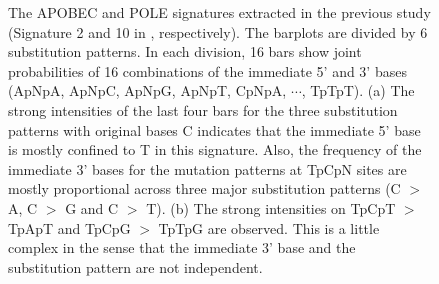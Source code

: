 \begin{figure}[b]
\centering
{}
  
  
\caption{The APOBEC and POLE signatures extracted in the previous study (Signature 2 and 10 in \cite{pmid23945592}, respectively).
The barplots are divided by 6 substitution patterns.
In each division, 16 bars show joint probabilities of 16 combinations of the immediate 5' and 3' bases  
(ApNpA, ApNpC, ApNpG, ApNpT, CpNpA, $\cdots$, TpTpT).
(a) The strong intensities of the last four bars for the three substitution patterns with original bases C 
indicates that the immediate 5' base is mostly confined to T in this signature.
Also, the frequency of the immediate 3' bases for the mutation patterns at TpCpN sites are mostly proportional across three major substitution patterns (C $>$ A, C $>$ G and C $>$ T).
(b) The strong intensities on TpCpT $>$ TpApT and TpCpG $>$ TpTpG are observed. This is a little complex in the sense that 
the immediate 3' base and the substitution pattern are not independent.
}
\label{nature2013_example}
\end{figure}


\clearpage


